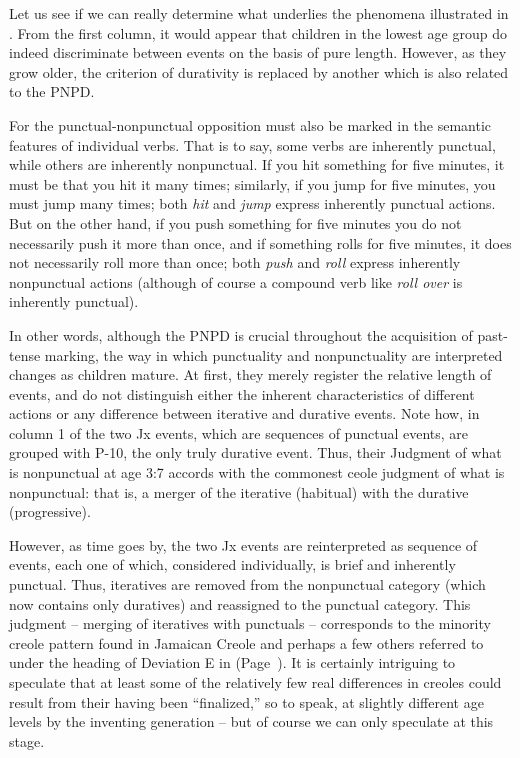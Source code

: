 Let us see if we can really determine what underlies the phenomena illustrated in . From the first column, it would appear that children in the lowest age group do indeed discriminate between events on the basis of pure length. However, as they grow older, the criterion of durativity is replaced by another which is also related to the PNPD.

For the punctual-nonpunctual opposition must also be marked in the semantic features of individual verbs. That is to say, some verbs are inherently punctual, while others are inherently nonpunctual. If you hit something for five minutes, it must be that you hit it many
times; similarly, if you jump for five minutes, you must jump many times; both \textit{hit} and \textit{jump} express inherently punctual actions. But on the other hand, if you push something for five minutes you do not necessarily push it more than once, and if something rolls for five minutes, it does not necessarily roll more than once; both \textit{push} and \textit{roll} express inherently nonpunctual actions (although of course a compound verb like \textit{roll over} is inherently punctual).

In other words, although the PNPD is crucial throughout the acquisition of past-tense marking, the way in which punctuality and nonpunctuality are interpreted changes as children mature. At first, they merely register the relative length of events, and do not distinguish either the inherent characteristics of different actions or any difference between iterative and durative events. Note how, in column 1 of  the two Jx events, which are sequences of punctual events, are grouped with P-10, the only truly durative event. Thus, their Judgment of what is nonpunctual at age 3:7 accords with the commonest ceole judgment of what is nonpunctual: that is, a merger of the iterative (habitual) with the durative (progressive).

However, as time goes by, the two Jx events are reinterpreted as sequence of events, each one of which, considered individually, is brief and inherently punctual. Thus, iteratives are removed from the nonpunctual category (which now contains only duratives) and reassigned to the punctual category. This judgment -- merging of iteratives with punctuals -- corresponds to the minority creole pattern found in Jamaican Creole and perhaps a few others referred to under the heading of Deviation E in  (Page~\pageref{majordeviations}). It is certainly intriguing to speculate that at least some of the relatively few real differences in creoles could result from their having been ``finalized,'' so to speak, at slightly different age levels by the inventing generation -- but of course we can only speculate at this stage.

